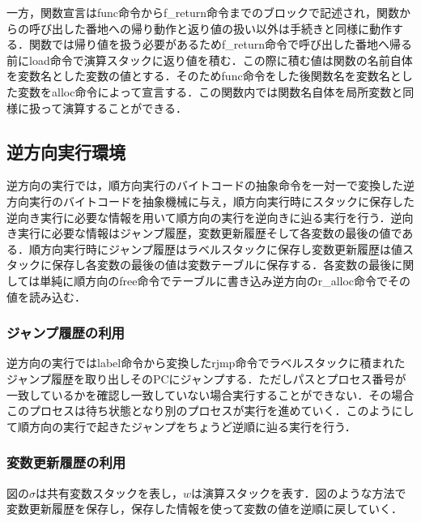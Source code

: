 \documentclass[submit,PRO]{ipsj}
\begin{document}
一方，関数宣言はfunc命令からf\_return命令までのブロックで記述され，関数からの呼び出した番地への帰り動作と返り値の扱い以外は手続きと同様に動作する．関数では帰り値を扱う必要があるためf\_return命令で呼び出した番地へ帰る前にload命令で演算スタックに返り値を積む．この際に積む値は関数の名前自体を変数名とした変数の値とする．そのためfunc命令をした後関数名を変数名とした変数をalloc命令によって宣言する．この関数内では関数名自体を局所変数と同様に扱って演算することができる．



\subsection{逆方向実行環境}
\label{sec:4.2}

逆方向の実行では，順方向実行のバイトコードの抽象命令を一対一で変換した逆方向実行のバイトコードを抽象機械に与え，順方向実行時にスタックに保存した逆向き実行に必要な情報を用いて順方向の実行を逆向きに辿る実行を行う．逆向き実行に必要な情報はジャンプ履歴，変数更新履歴そして各変数の最後の値である．順方向実行時にジャンプ履歴はラベルスタックに保存し変数更新履歴は値スタックに保存し各変数の最後の値は変数テーブルに保存する．各変数の最後に関しては単純に順方向のfree命令でテーブルに書き込み逆方向のr\_alloc命令でその値を読み込む．


\subsubsection{ジャンプ履歴の利用}


逆方向の実行ではlabel命令から変換したrjmp命令でラベルスタックに積まれたジャンプ履歴を取り出しそのPCにジャンプする．ただしパスとプロセス番号が一致しているかを確認し一致していない場合実行することができない．その場合このプロセスは待ち状態となり別のプロセスが実行を進めていく．このようにして順方向の実行で起きたジャンプをちょうど逆順に辿る実行を行う．

\subsubsection{変数更新履歴の利用}

図の$\sigma$は共有変数スタックを表し，$w$は演算スタックを表す．図のような方法で変数更新履歴を保存し，保存した情報を使って変数の値を逆順に戻していく．
\end{document}
